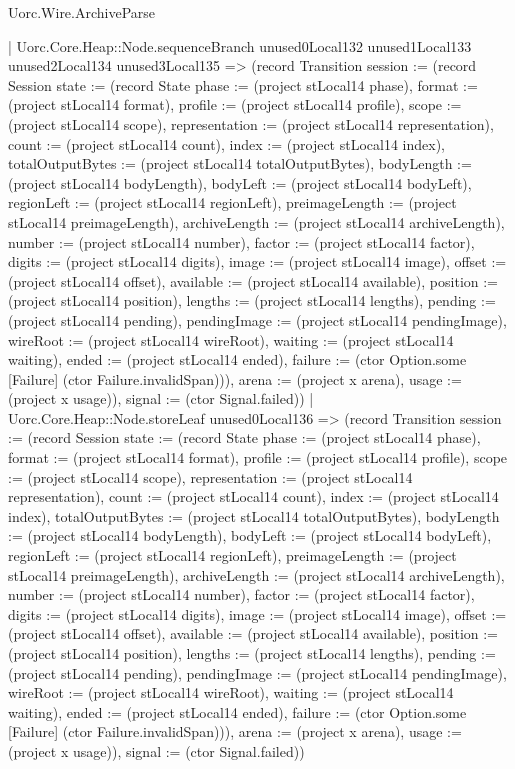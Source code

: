 \begin{lexlean}{Uorc.Wire.ArchiveParse}
\begin{semanticmodule}
{            | Uorc.Core.Heap::Node.sequenceBranch unused0Local132 unused1Local133 unused2Local134 unused3Local135 => (record Transition {session := (record Session {state := (record State {phase := (project stLocal14 phase), format := (project stLocal14 format), profile := (project stLocal14 profile), scope := (project stLocal14 scope), representation := (project stLocal14 representation), count := (project stLocal14 count), index := (project stLocal14 index), totalOutputBytes := (project stLocal14 totalOutputBytes), bodyLength := (project stLocal14 bodyLength), bodyLeft := (project stLocal14 bodyLeft), regionLeft := (project stLocal14 regionLeft), preimageLength := (project stLocal14 preimageLength), archiveLength := (project stLocal14 archiveLength), number := (project stLocal14 number), factor := (project stLocal14 factor), digits := (project stLocal14 digits), image := (project stLocal14 image), offset := (project stLocal14 offset), available := (project stLocal14 available), position := (project stLocal14 position), lengths := (project stLocal14 lengths), pending := (project stLocal14 pending), pendingImage := (project stLocal14 pendingImage), wireRoot := (project stLocal14 wireRoot), waiting := (project stLocal14 waiting), ended := (project stLocal14 ended), failure := (ctor Option.some [Failure] (ctor Failure.invalidSpan))}), arena := (project x arena), usage := (project x usage)}), signal := (ctor Signal.failed)})
            | Uorc.Core.Heap::Node.storeLeaf unused0Local136 => (record Transition {session := (record Session {state := (record State {phase := (project stLocal14 phase), format := (project stLocal14 format), profile := (project stLocal14 profile), scope := (project stLocal14 scope), representation := (project stLocal14 representation), count := (project stLocal14 count), index := (project stLocal14 index), totalOutputBytes := (project stLocal14 totalOutputBytes), bodyLength := (project stLocal14 bodyLength), bodyLeft := (project stLocal14 bodyLeft), regionLeft := (project stLocal14 regionLeft), preimageLength := (project stLocal14 preimageLength), archiveLength := (project stLocal14 archiveLength), number := (project stLocal14 number), factor := (project stLocal14 factor), digits := (project stLocal14 digits), image := (project stLocal14 image), offset := (project stLocal14 offset), available := (project stLocal14 available), position := (project stLocal14 position), lengths := (project stLocal14 lengths), pending := (project stLocal14 pending), pendingImage := (project stLocal14 pendingImage), wireRoot := (project stLocal14 wireRoot), waiting := (project stLocal14 waiting), ended := (project stLocal14 ended), failure := (ctor Option.some [Failure] (ctor Failure.invalidSpan))}), arena := (project x arena), usage := (project x usage)}), signal := (ctor Signal.failed)})
}
\end{semanticmodule}
\end{lexlean}
